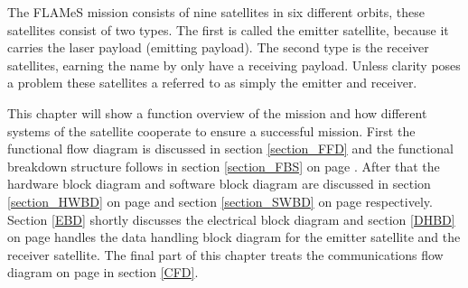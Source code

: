 \label{MissionApproachIntro}

The \ac{FLAMeS} mission consists of nine satellites in six different orbits, these satellites consist of two types. The first is called the emitter satellite, because it carries the laser payload (emitting payload). The second type is the receiver satellites, earning the name by only have a receiving payload. Unless clarity poses a problem these satellites a referred to as simply the emitter and receiver.

This chapter will show a function overview of the mission and how different systems of the satellite cooperate to ensure a successful mission. First the functional flow diagram is discussed in section \ref{section_FFD} and the functional breakdown structure follows in section \ref{section_FBS} on page \pageref{section_FBS}. After that the hardware block diagram and software block diagram are discussed in section \ref{section_HWBD} on page \pageref{section_HWBD} and section \ref{section_SWBD} on page \pageref{section_SWBD} respectively. Section \ref{EBD} shortly discusses the electrical block diagram and section \ref{DHBD} on page \pageref{DHBD} handles the data handling block diagram for the emitter satellite and the receiver satellite. The final part of this chapter treats the communications flow diagram on page \pageref{CFD} in section \ref{CFD}.